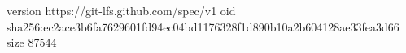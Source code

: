 version https://git-lfs.github.com/spec/v1
oid sha256:ec2ace3b6fa7629601fd94ec04bd1176328f1d890b10a2b604128ae33fea3d66
size 87544
